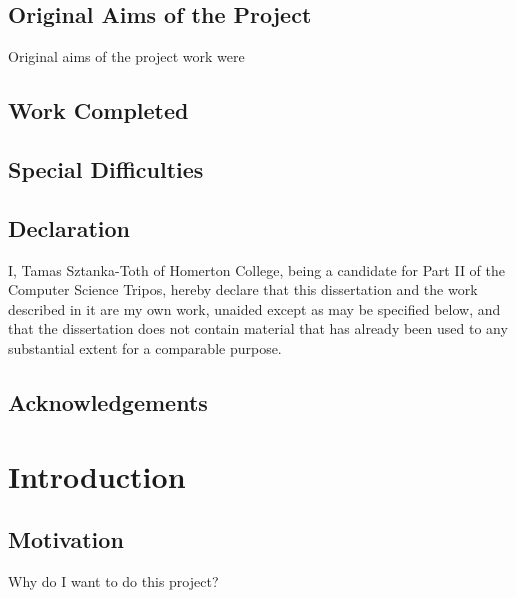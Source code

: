 \documentclass[12pt,twoside,notitlepage]{report}
\begin{document}
\section*{Original Aims of the Project}
Original aims of the project work were\cite{Git} \cite{SZZ}\cite{KimZim}\cite{KimZim}
\cite{FixCache}

\section*{Work Completed}

\section*{Special Difficulties}
 
\newpage
\section*{Declaration}

I, Tamas Sztanka-Toth of Homerton College, being a candidate for Part II of the Computer
Science Tripos, hereby declare
that this dissertation and the work described in it are my own work,
unaided except as may be specified below, and that the dissertation
does not contain material that has already been used to any substantial
extent for a comparable purpose.

\bigskip
{}

\medskip
{}

\cleardoublepage

\tableofcontents

\listoffigures

\newpage
\section*{Acknowledgements}



\cleardoublepage        %

\setcounter{page}{1}
\pagestyle{headings}

\chapter{Introduction}
\section{Motivation}
Why do I want to do this project?
\end{document}
